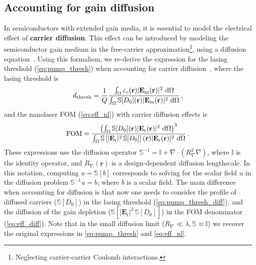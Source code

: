 \subsection*{Accounting for gain diffusion}

In semiconductors with extended gain media, it is essential to model the electrical effect of \textbf{carrier diffusion}. This effect can be introduced by modeling the semiconductor gain medium in the free-carrier approximation\footnote{Neglecting carrier-carrier Coulomb interactions.}, using a diffusion 
equation~\cite{csalt}. Using this formalism, we re-derive the expression for the lasing threshold (\eqref{eq:pump_thresh}) when accounting for carrier diffusion~\cite{ownpub4}, where the lasing threshold is
\begin{equation}\label{eq:pump_thresh_diff}
 d_\text{thresh} = \frac{1}{Q} \frac{\int_{\Omega} \varepsilon_c(\mathbf{r})|\mathbf{E}_{\text{m}}(\mathbf{r})|^2\, \mathop{}\!\text{d} \Omega}{\int_{\Omega} \mathbb{S} [D_0] (\mathbf{r}) |\mathbf{E}_{\text{m}}(\mathbf{r})|^2\, \mathop{}\!\text{d} \Omega}\,,
\end{equation}
and the nanolaser FOM (\eqref{eq:eff_nl}) with carrier diffusion effects is
\begin{equation}\label{eq:eff_diff}
 \text{FOM} =  \frac{\left(\int_{\Omega} \mathbb{S} [D_0](\mathbf{r}) |\mathbf{E}_{\text{r}}(\mathbf{r})|^2 \, \mathop{}\!\text{d} \Omega\right)^3} {\int_{\Omega} \mathbb{S}\left[ |\mathbf{E}_{\text{r}}|^2\, \mathbb{S} [D_0] \right] (\mathbf{r})|\mathbf{E}_{\text{r}}(\mathbf{r})|^2 \, \mathop{}\!\text{d} \Omega}\,.
\end{equation}
These expressions use the diffusion operator $\mathbb{S}^{-1}= \mathbb{I}+\nabla \cdot (R_\nabla^2 \nabla)$, where $\mathbb{I}$ is the identity operator, and $R_\nabla (\mathbf{r})$ is a design-dependent diffusion lengthscale.
In this notation, computing $u = \mathbb{S}[b]$ corresponds to solving for the scalar field $u$ in the diffusion problem $\mathbb{S}^{-1}u=b$, where $b$ is a scalar field. 
The main difference when accounting for diffusion is that now one needs to consider the profile of diffused carriers ($\mathbb{S} [D_0]$) in the lasing threshold (\eqref{eq:pump_thresh_diff}), and the diffusion of the gain depletion ($\mathbb{S}[ |\mathbf{E}_{\text{r}}|^2\, \mathbb{S} [D_0]]$)
in the FOM denominator (\eqref{eq:eff_diff}). Note that in the small diffusion limit ($R_\nabla \ll \lambda, \mathbb{S} \approx \mathbb{I}$)
we recover the original expressions in \eqref{eq:pump_thresh} and \eqref{eq:eff_nl}.

